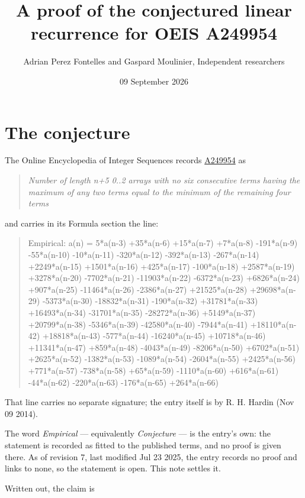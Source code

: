 \documentclass[11pt]{article}
\title{A proof of the conjectured linear recurrence for OEIS A249954}
\author{Adrian Perez Fontelles and Gaspard Moulinier, Independent researchers}
\date{09 September 2026}
\theoremstyle{definition}
\begin{document}
\maketitle
\section{The conjecture}

The Online Encyclopedia of Integer Sequences records \href{https://oeis.org/A249954}{A249954} as

\begin{quote}\itshape Number of length n+5 0..2 arrays with no six consecutive terms having the maximum of any two terms equal to the minimum of the remaining four terms\end{quote}

and carries in its Formula section the line:

\begin{quote}\ttfamily Empirical: a(n) = 5*a(n-3) +35*a(n-6) +15*a(n-7) +7*a(n-8) -191*a(n-9) -55*a(n-10) -10*a(n-11) -320*a(n-12) -392*a(n-13) -267*a(n-14) +2249*a(n-15) +1501*a(n-16) +425*a(n-17) -100*a(n-18) +2587*a(n-19) +3278*a(n-20) -7702*a(n-21) -11903*a(n-22) -6372*a(n-23) +6826*a(n-24) +907*a(n-25) -11464*a(n-26) -2386*a(n-27) +21525*a(n-28) +29698*a(n-29) -5373*a(n-30) -18832*a(n-31) -190*a(n-32) +31781*a(n-33) +16493*a(n-34) -31701*a(n-35) -28272*a(n-36) +5149*a(n-37) +20799*a(n-38) -5346*a(n-39) -42580*a(n-40) -7944*a(n-41) +18110*a(n-42) +18818*a(n-43) -577*a(n-44) -16240*a(n-45) +10718*a(n-46) +11341*a(n-47) +859*a(n-48) -4043*a(n-49) -8206*a(n-50) +6702*a(n-51) +2625*a(n-52) -1382*a(n-53) -1089*a(n-54) -2604*a(n-55) +2425*a(n-56) +771*a(n-57) -738*a(n-58) +65*a(n-59) -1110*a(n-60) +616*a(n-61) -44*a(n-62) -220*a(n-63) -176*a(n-65) +264*a(n-66)\end{quote}

That line carries no separate signature; the entry itself is by R. H. Hardin (Nov 09 2014).

The word {\itshape Empirical} --- equivalently {\itshape Conjecture} --- is the entry's own: the statement is recorded as fitted to the published terms, and no proof is given there. As of revision 7, last modified Jul 23 2025, the entry records no proof and links to none, so the statement is open. This note settles it.

Written out, the claim is
\end{document}
